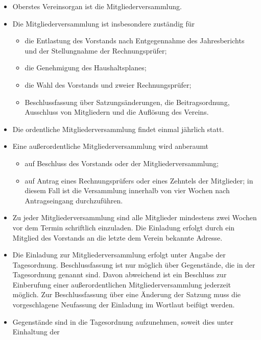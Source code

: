 \documentclass[11pt]{article}
\def\items#1{{%
  \itcounter0%
  \begin{itemize}
  #1
  \end{itemize}
}}
\let\it\item%
\def\item{
  \advance\itcounter1%
  \it[(\the\itcounter)]
}
\begin{document}
\items{
   \item Oberstes Vereinsorgan ist die Mitgliederversammlung.
   \item Die Mitgliederversammlung ist insbesondere zust{\"a}ndig f{\"u}r
     \items{
       \item die Entlastung des Vorstands nach Entgegennahme des Jahresberichts und der
                Stellungnahme der Rechnungspr{\"u}fer;
       \item die Genehmigung des Haushaltsplanes;
       \item die Wahl des Vorstands und zweier Rechnungspr{\"u}fer;
       \item Beschlussfassung {\"u}ber Satzungs{\"a}nderungen, die Beitragsordnung, Ausschluss von
                Mitgliedern und die Aufl{\"o}sung des Vereins.
     }
   \item Die ordentliche Mitgliederversammlung findet einmal j{\"a}hrlich statt.
   \item Eine au{\ss}erordentliche Mitgliederversammlung wird anberaumt
     \items{
       \item auf Beschluss des Vorstands oder der Mitgliederversammlung;
       \item auf Antrag eines Rechnungspr{\"u}fers oder eines
                Zehntels der Mitglieder; in diesem Fall ist die Versammlung innerhalb von
                vier Wochen nach Antragseingang durchzuf{\"u}hren.
     }
   \item Zu jeder Mitgliederversammlung sind alle Mitglieder mindestens zwei Wochen vor
       dem Termin schriftlich einzuladen.
       Die Einladung erfolgt durch ein Mitglied des Vorstands an die letzte dem Verein bekannte Adresse.
   \item
       Die Einladung zur Mitgliederversammlung erfolgt unter Angabe der Tagesordnung.
       Beschlussfassung ist nur m{\"o}glich {\"u}ber Gegenst{\"a}nde, die in der Tagesordnung
       genannt sind. Davon abweichend ist ein Beschluss zur Einberufung einer
       au{\ss}erordentlichen Mitgliederversammlung jederzeit m{\"o}glich.
       Zur Beschlussfassung {\"u}ber eine {\"A}nderung der Satzung muss die vorgeschlagene
       Neufassung der Einladung im Wortlaut beif{\"u}gt werden.
    \item 
       Gegenst{\"a}nde sind in die Tagesordnung aufzunehmen, soweit dies unter Einhaltung der
}
\end{document}
